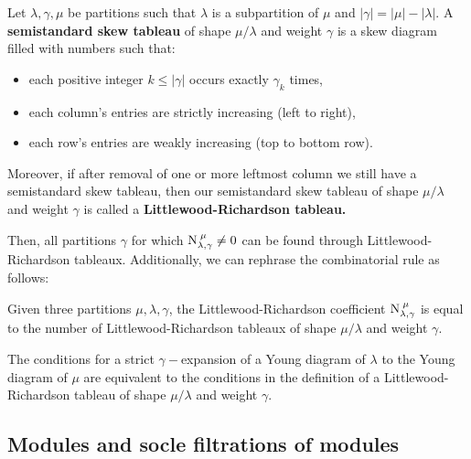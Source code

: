 \documentclass[main.tex]{subfiles}
\begin{document}
 \begin{defn}
    \label{def-skew-tableau}
     Let $\lambda, \gamma, \mu$ be partitions such that $\lambda$ is a subpartition of $\mu$ and $|\gamma|=|\mu|-|\lambda|.$ A \textbf{semistandard skew tableau} of shape $\mu/\lambda$ and weight $\gamma$ is a skew diagram filled with numbers such that:
     \begin{itemize}
         \item each positive integer $k\leq|\gamma|$ occurs exactly $\gamma_k$ times,
         \item each column's entries are strictly increasing (left to right),
         \item each row's entries are weakly increasing (top to bottom row).
     \end{itemize}
     Moreover, if after removal of one or more leftmost column we still have a semistandard skew tableau, then our semistandard skew tableau of shape $\mu/\lambda$ and weight $\gamma$ is called a \textbf{Littlewood-Richardson tableau.}
 \end{defn}

 \bigskip



 Then, all partitions $\gamma$ for which $\text{N}^{\;\mu}_{\lambda, \gamma}\neq 0$ can be found through Littlewood-Richardson tableaux. Additionally, we can rephrase the combinatorial rule as follows:

\bigskip

 \begin{thm}
 \label{LR-comb-rule-tableaux}
     Given three partitions $\mu, \lambda, \gamma$, the Littlewood-Richardson coefficient $\text{N}^{\;\mu}_{\lambda, \gamma}$ is equal to the number of Littlewood-Richardson tableaux of shape $\mu/\lambda$ and weight $\gamma$.
 \end{thm}
\bigskip

\begin{crl}
    \label{crl-expansion-tableau}
     The conditions for a strict $\gamma-$expansion of a Young diagram of $\lambda$ to the Young diagram of $\mu$ are equivalent to the conditions in the definition of a Littlewood-Richardson tableau of shape $\mu/\lambda$ and weight $\gamma$.
\end{crl}

\subsection{Modules and socle filtrations of modules}
\end{document}
